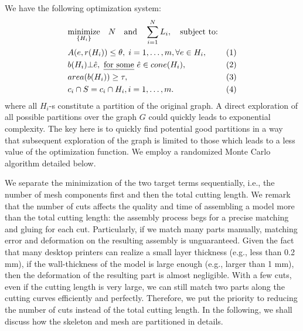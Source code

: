 We have the following optimization system:
\begin{equation*}
\begin{aligned}
& \underset{\{H_i\}}{\text{minimize}} \quad N \quad \text{and} \quad \sum_{i=1}^N{L_i},
\quad \text{subject to:} \\
& A(e, r(H_i)) \leq \theta, \; i = 1, \ldots, m, \forall e \in H_i, & (1)\\
& b(H_i) \bot \hat{e}, \text{ \emph{for some} } \hat{e} \in cone(H_i), & (2)\\
& area(b(H_i)) \geq \tau, & (3)\\
& c_i \cap S = c_i \cap H_i, i = 1, \ldots, m.  & (4)
\end{aligned}
\end{equation*}
where all $H_i$-s constitute a partition of the original graph. A direct exploration of all possible partitions over the graph $G$ could quickly leads to exponential complexity. The key here is to quickly find potential good partitions in a way that subsequent exploration of the graph is limited to those which leads to a less value of the optimization function. We employ a randomized Monte Carlo algorithm detailed below.

We separate the minimization of the two target terms sequentially, i.e., the number of mesh components first and then the total cutting length. We remark that the number of cuts affects the quality and time of assembling a model more than the total cutting length: the assembly process begs for a precise matching and gluing for each cut. Particularly, if we match many parts manually, matching error and deformation on the resulting assembly is unguaranteed. Given the fact that many desktop printers can realize a small layer thickness (e.g., less than 0.2 mm), if the wall-thickness of the model is large enough (e.g., larger than 1 mm), then the deformation of the resulting part is almost negligible. With a few cuts, even if the cutting length is very large, we can still match two parts along the cutting curves efficiently and perfectly. Therefore, we put the priority to reducing the number of cuts instead of the total cutting length.
In the following, we shall discuss how the skeleton and mesh are partitioned in details.

